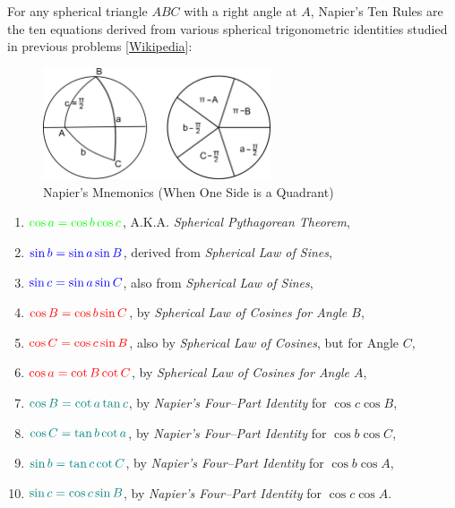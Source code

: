 \begin{tcolorbox}[title={Napier's Ten Right Spherical Triangle Commandments}]
    \begin{question}[name={Napier's Ten Commandments}]
        For any spherical triangle $ABC$ with a right angle at $A$, Napier's Ten Rules are the ten equations derived from various spherical trigonometric identities studied in previous problems [\href{https://commons.wikimedia.org/wiki/File:Spherical_trigonometry_Napier_quadrantal_01.svg}{Wikipedia}]:
        
    \begin{figure}[H]
        \centering
        \includegraphics[width=0.6\textwidth]{IMG/Napier2.png}
        \caption{Napier's Mnemonics (When One Side is a Quadrant)}
        \label{fig:napierfive2}
    \end{figure}

    \begin{enumerate}
            \item[\color{green}(I)] $\color{green} \cos a = \cos b \cos c$, A.K.A. \textit{\color{green} Spherical Pythagorean Theorem},
            \item[\color{blue}(II)] $\color{blue} \sin b = \sin a \sin B$, derived from \textit{Spherical Law of Sines},
            \item[\color{blue}(III)] $\color{blue} \sin c = \sin a \sin C$, also from \textit{Spherical Law of Sines},
            \item[\color{red}(IV)] $\color{red} \cos B = \cos b \sin C$, by \textit{Spherical Law of Cosines for Angle $B$},
            \item[\color{red}(V)] $\color{red} \cos C = \cos c \sin B$, also by \textit{Spherical Law of Cosines}, but for Angle $C$,
            \item[\color{red}(VI)] $\color{red} \cos a = \cot B \cot C$, by \textit{Spherical Law of Cosines for Angle $A$},
            \item[\color{teal}(VII)] $\color{teal} \cos B = \cot a \tan c$, by \textit{Napier's Four--Part Identity} for $\cos c \cos B$,
            \item[\color{teal}(VIII)]$\color{teal} \cos C = \tan b \cot a$, by \textit{Napier's Four--Part Identity} for $\cos b \cos C$,
            \item[\color{teal}(IX)]  $\color{teal} \sin b = \tan c \cot C$, by \textit{Napier's Four--Part Identity} for $\cos b \cos A$,
            \item[\color{teal}(X)] $\color{teal} \sin c = \cos c \sin B$, by \textit{Napier's Four--Part Identity} for $\cos c \cos A$.
        \end{enumerate}
    \end{question}
    

\end{tcolorbox}
